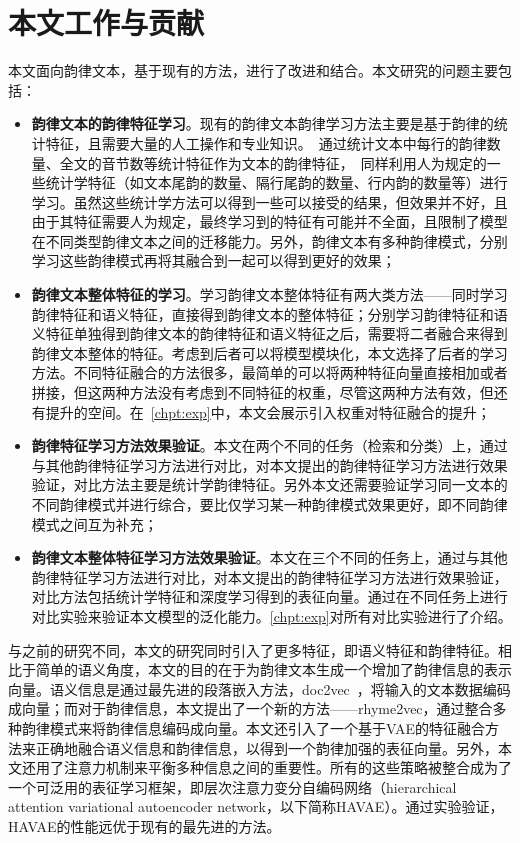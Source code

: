 \section{本文工作与贡献}
本文面向韵律文本，基于现有的方法，进行了改进和结合。本文研究的问题主要包括：

\begin{itemize}
  \item {\bf 韵律文本的韵律特征学习}。现有的韵律文本韵律学习方法主要是基于韵律的统计特征，且需要大量的人工操作和专业知识。~\autocite{hirjee2010rhyme}通过统计文本中每行的韵律数量、全文的音节数等统计特征作为文本的韵律特征，~\autocite{Malmi2016dopelearning}同样利用人为规定的一些统计学特征（如文本尾韵的数量、隔行尾韵的数量、行内韵的数量等）进行学习。虽然这些统计学方法可以得到一些可以接受的结果，但效果并不好，且由于其特征需要人为规定，最终学习到的特征有可能并不全面，且限制了模型在不同类型韵律文本之间的迁移能力。另外，韵律文本有多种韵律模式，分别学习这些韵律模式再将其融合到一起可以得到更好的效果；
  \item {\bf 韵律文本整体特征的学习}。学习韵律文本整体特征有两大类方法——同时学习韵律特征和语义特征，直接得到韵律文本的整体特征；分别学习韵律特征和语义特征单独得到韵律文本的韵律特征和语义特征之后，需要将二者融合来得到韵律文本整体的特征。考虑到后者可以将模型模块化，本文选择了后者的学习方法。不同特征融合的方法很多，最简单的可以将两种特征向量直接相加或者拼接，但这两种方法没有考虑到不同特征的权重，尽管这两种方法有效，但还有提升的空间。在~\ref{chpt:exp}中，本文会展示引入权重对特征融合的提升；
  \item {\bf 韵律特征学习方法效果验证}。本文在两个不同的任务（检索和分类）上，通过与其他韵律特征学习方法进行对比，对本文提出的韵律特征学习方法进行效果验证，对比方法主要是统计学韵律特征。另外本文还需要验证学习同一文本的不同韵律模式并进行综合，要比仅学习某一种韵律模式效果更好，即不同韵律模式之间互为补充；
  \item {\bf 韵律文本整体特征学习方法效果验证}。本文在三个不同的任务上，通过与其他韵律特征学习方法进行对比，对本文提出的韵律特征学习方法进行效果验证，对比方法包括统计学特征和深度学习得到的表征向量。通过在不同任务上进行对比实验来验证本文模型的泛化能力。\ref{chpt:exp}对所有对比实验进行了介绍。
\end{itemize}
\par

与之前的研究不同，本文的研究同时引入了更多特征，即语义特征和韵律特征。相比于简单的语义角度，本文的目的在于为韵律文本生成一个增加了韵律信息的表示向量。语义信息是通过最先进的段落嵌入方法，doc2vec~\autocite{quoc2014distributed}，将输入的文本数据编码成向量；而对于韵律信息，本文提出了一个新的方法——rhyme2vec，通过整合多种韵律模式来将韵律信息编码成向量。本文还引入了一个基于VAE的特征融合方法来正确地融合语义信息和韵律信息，以得到一个韵律加强的表征向量。另外，本文还用了注意力机制来平衡多种信息之间的重要性。所有的这些策略被整合成为了一个可泛用的表征学习框架，即层次注意力变分自编码网络（hierarchical attention variational autoencoder network，以下简称HAVAE）。通过实验验证，HAVAE的性能远优于现有的最先进的方法。\par

